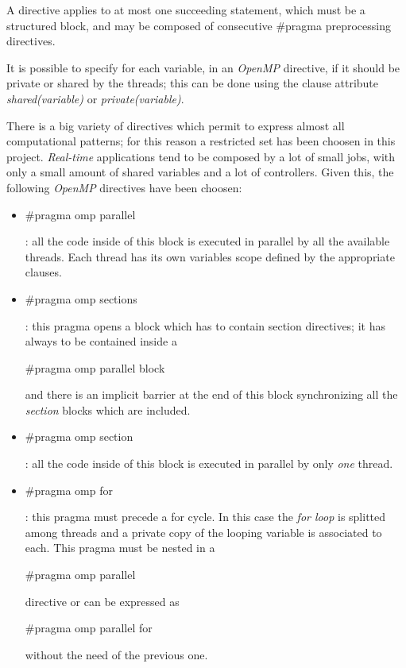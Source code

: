 \documentclass[a4paper,11pt,oneside]{book}
\begin{document}
A directive applies to at most one succeeding statement, which must be a structured block, and may be composed of consecutive $\#$pragma preprocessing directives. 

It is possible to specify for each variable, in an \emph{OpenMP} directive, if it should be private or shared by the threads; this can be done using the clause attribute \emph{shared(variable)} or \emph{private(variable)}.

There is a big variety of directives which permit to express almost all computational patterns; for this reason a restricted set has been choosen in this project. \emph{Real-time} applications tend to be composed by a lot of small jobs, with only a small amount of shared variables and a lot of controllers. Given this, the following \emph{OpenMP} directives have been choosen:
\begin{itemize}
\item{\begin{bf}{$\#$pragma omp parallel}\end{bf} : all the code inside of this block is executed in parallel by all the available threads. Each thread has its own variables scope defined by the appropriate clauses. }
\item{\begin{bf}{$\#$pragma omp sections}\end{bf} : this pragma opens a block which has to contain section directives; it has always to be contained inside a \begin{bf}$\#$pragma omp parallel block\end{bf} and there is an implicit barrier at the end of this block synchronizing all the \emph{section} blocks which are included. }
\item{\begin{bf}{$\#$pragma omp section}\end{bf} : all the code inside of this block is executed in parallel by only \emph{one} thread. }
\item{\begin{bf}{$\#$pragma omp for}\end{bf} : this pragma must precede a for cycle. In this case the \emph{for loop} is splitted among  threads and a private copy of the looping variable is associated to each. This pragma must be nested in a \begin{bf}$\#$pragma omp parallel\end{bf} directive or can be expressed as \begin{bf}{$\#$pragma omp parallel for}\end{bf} without the need of the previous one.  }

\end{itemize}
\end{document}
